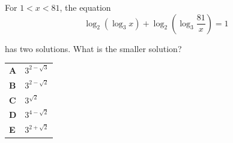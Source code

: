 \documentclass[11pt,a4paper]{article}
\begin{document}
\begin{enumerate}[label=\textbf{\arabic*.},leftmargin=*,itemsep=0pt,start=3]
For $1<x<81$, the equation
\[\log_2(\log_3 x)+\log_2\!\left(\log_3\frac{81}{x}\right)=1\]

has two solutions. What is the smaller solution?

\par\vspace*{12pt}
\begin{tabularx}{\linewidth}{@{}>{\bfseries}l Y@{}}
A &
$3^{2-\sqrt{3}}$
\\[0.8em]
B &
$3^{2-\sqrt{2}}$
\\[0.8em]
C &
$3^{\sqrt{2}}$
\\[0.8em]
D &
$3^{4-\sqrt{2}}$
\\[0.8em]
E &
$3^{2+\sqrt{2}}$
\\
\end{tabularx}
\end{enumerate}
\clearpage
\thispagestyle{djspaper}
\vspace*{8pt}
\end{document}
